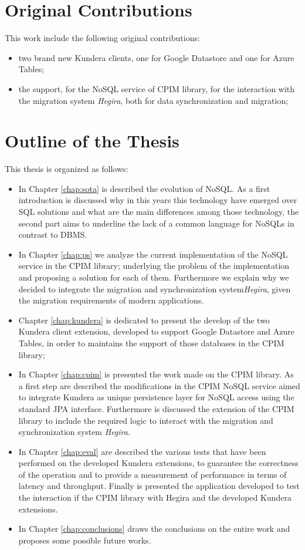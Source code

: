\section*{Original Contributions}
This work include the following original contributions:
\begin{itemize}
\item two brand new Kundera clients, one for Google Datastore and one for Azure Tables;
\item the support, for the  NoSQL service of CPIM library, for the interaction with the migration system \textit{Hegira}, both for data synchronization and migration; 
\end{itemize}

\section*{Outline of the Thesis}
This thesis is organized as follows: 
\begin{itemize}
\item In Chapter \ref{chap:sota} is described the evolution of NoSQL. As a first introduction is discussed why in this years this technology have emerged over SQL solutions and what are the main differences among those technology, the second part aims to underline the lack of a common language for NoSQLs in contrast to DBMS.
\item In Chapter \ref{chap:ps} we analyze the current implementation of the NoSQL service in the CPIM library; underlying the problem of the implementation and proposing a solution for each of them. Furthermore we explain why we decided to integrate the migration and synchronization system\textit{Hegira}, given the migration requirements of modern applications.
\item Chapter \ref{chap:kundera} is dedicated to present the develop of the two Kundera client extension, developed to support Google Datastore and Azure Tables, in order to maintains the support of those databases in the CPIM library;
\item In Chapter \ref{chap:cpim} is presented the work made on the CPIM library. As a first step are described the modifications in the CPIM NoSQL service aimed to integrate Kundera as unique persistence layer for NoSQL access using the standard JPA interface. Furthermore is discussed the extension of the CPIM library to include the required logic to interact with the migration and synchronization system \textit{Hegira}.
\item In Chapter \ref{chap:eval} are described the various tests that have been performed on the developed Kundera extensions, to guarantee the correctness of the operation and to provide a measurement of performance in terms of latency and throughput. Finally is presented the application developed to test the interaction if the CPIM library with Hegira and the developed Kundera extensions.
\item In Chapter \ref{chap:conclusions} draws the conclusions on the entire work and proposes some possible future works.
\end{itemize}

